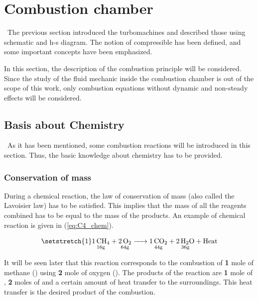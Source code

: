 \newpage
\section{Combustion chamber}
\quad\ The previous section introduced the turbomachines and described those using schematic and h-s diagram. The notion of compressible has been defined, and some important concepts have been emphasized.

In this section, the description of the combustion principle will be considered. Since the study of the fluid mechanic inside the combustion chamber is out of the scope of this work, only combustion equations without dynamic and non-steady effects will be considered.

\subsection{Basis about Chemistry}
\quad\ As it has been mentioned, some combustion reactions will be introduced in this section. Thus, the basic knowledge about chemistry has to be provided.

\subsubsection{Conservation of mass}
During a chemical reaction, the law of conservation of mass (also called the Lavoisier law) has to be satisfied. This implies that the mass of all the reagents combined has to be equal to the mass of the products. An example of chemical reaction is given in (\ref{eq:C4_chem}).

\begin{equation}
    \setstretch{1}
    \underset{\mathrm{16g}}{\ce{1CH4}} \ce{+} \underset{\mathrm{64g}}{\ce{2O2}} \ce{->} \underset{\mathrm{44g}}{\ce{1CO2}} \ce{+} \underset{\mathrm{36g}}{\ce{2H2O}} \ce{+}\text{Heat}\label{eq:C4_chem}
\end{equation}

It will be seen later that this reaction corresponds to the combustion of \textbf{1} mole of methane () using \textbf{2} mole of oxygen (). The products of the reaction are \textbf{1} mole of , \textbf{2} moles of  and a certain amount of heat transfer to the surroundings. This heat transfer is the desired product of the combustion.

